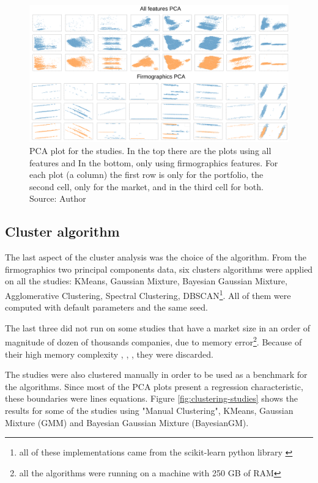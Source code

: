 \begin{figure}[h]
   \centering
   \includegraphics[width=\linewidth]{fig/ch3-pca-plot.png}
   \caption{PCA plot for the studies. In the top there are the plots using all features and In the bottom, only using firmographics features. For each plot (a column) the first row is only for the portfolio, the second cell, only for the market, and in the third cell for both. Source: Author}
   \label{fig:pca-plot}
\end{figure}

\subsection{Cluster algorithm}
\label{ch:cluster-algorithm}

The last aspect of the cluster analysis was the choice of the algorithm. From the firmographics two principal components data, six clusters algorithms were applied on all the studies: KMeans, Gaussian Mixture, Bayesian Gaussian Mixture, Agglomerative Clustering, Spectral Clustering, DBSCAN\footnote{all of these implementations came from the scikit-learn python library \cite{scikit-learn}}. All of them were computed with default parameters and the same seed.

The last three did not run on some studies that have a market size in an order of magnitude of dozen of thousands companies, due to memory error\footnote{all the algorithms were running on a machine with 250 GB of RAM}. Because of their high memory complexity \cite{franti2006fast}, \cite{ester1996density}, \cite{yan2009fast}, they were discarded.

The studies were also clustered manually in order to be used as a benchmark for the algorithms. Since most of the PCA plots present a regression characteristic, these boundaries were lines equations. Figure \ref{fig:clustering-studies} shows the results for some of the studies using "Manual Clustering", KMeans, Gaussian Mixture (GMM) and Bayesian Gaussian Mixture (BayesianGM).

